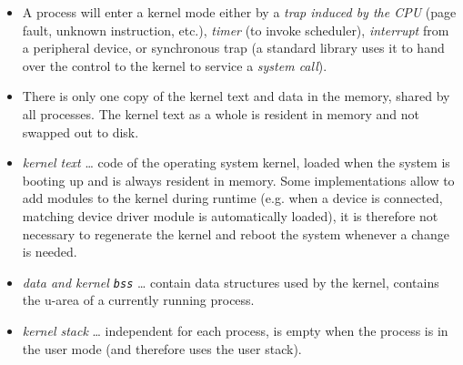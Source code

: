 
\begin{slide}
\begin{center}

\end{center}
\end{slide}

\begin{itemize}
\item A process will enter a kernel mode either by a
\emph{trap induced by the CPU} (page fault, unknown instruction, etc.),
\emph{timer} (to invoke scheduler), \emph{interrupt} from a peripheral device,
or synchronous trap (a standard library uses it to hand over the control to
the kernel to service a \emph{system call}).
\item There is only one copy of the kernel text and data in the memory,
shared by all processes. The kernel text as a whole is resident in memory and
not swapped out to disk.
\item \emph{kernel text} \dots{} code of the operating system kernel,
loaded when the system is booting up and is always resident in memory.
Some implementations allow to add modules to the kernel during runtime
(e.g. when a device is connected, matching device driver module is
automatically loaded), it is therefore not necessary to regenerate
the kernel and reboot the system whenever a change is needed.
\item \emph{data and kernel \texttt{bss}} \dots{} contain data structures used
by the kernel, contains the u-area of a currently running process.
\item \emph{kernel stack} \dots{} independent for each process, is empty
when the process is in the user mode (and therefore uses the user stack).
\end{itemize}



\begin{slide}
\begin{center}

\end{center}
\end{slide}

